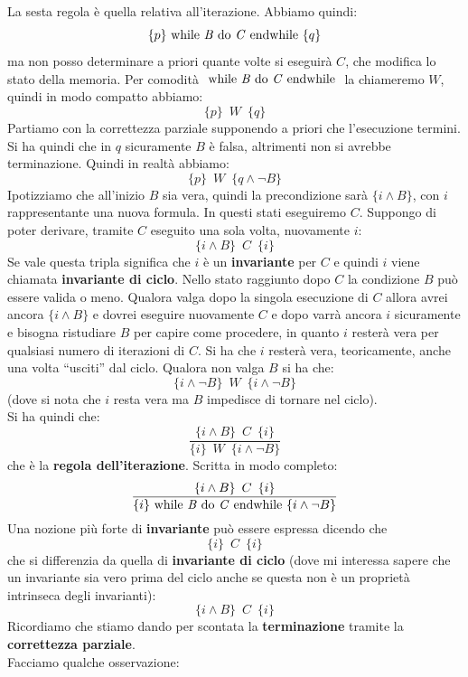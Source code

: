 \documentclass[a4paper,12pt, oneside]{book}
\begin{document}
\begin{definizione}
  La sesta regola è quella relativa all'iterazione. Abbiamo quindi:
  \[\{p\}\mbox{ while \textit{B} do \textit{C} endwhile }\{q\}\]
  ma non posso determinare a priori quante volte si eseguirà $C$, che modifica
  lo stato della memoria. Per comodità $\mbox{ while \textit{B} do \textit{C}
    endwhile }$ la chiameremo $W$, quindi in modo compatto abbiamo:
  \[\{p\}\,\,\,W\,\,\,\{q\}\]
  Partiamo con la correttezza parziale supponendo a priori che l'esecuzione
  termini. Si ha quindi che in $q$ sicuramente $B$ è falsa, altrimenti non si
  avrebbe terminazione. Quindi in realtà abbiamo:
  \[\{p\}\,\,\,W\,\,\,\{q\land \neg B\}\]
  Ipotizziamo che all'inizio $B$ sia vera, quindi la precondizione sarà
  $\{i\land B\}$, con $i$ rappresentante una nuova formula. In questi stati
  eseguiremo $C$. Suppongo di poter derivare, tramite $C$ eseguito una sola
  volta, nuovamente $i$:
  \[\{i\land B\}\,\,\,C\,\,\,\{i\}\]
  Se vale questa tripla significa che $i$ è un \textbf{invariante} per $C$ e
  quindi $i$ viene chiamata \textbf{invariante di ciclo}. Nello stato raggiunto
  dopo $C$ la condizione $B$ può essere valida o meno. Qualora valga dopo la
  singola esecuzione di $C$ allora avrei ancora $\{i\land B\}$ e dovrei eseguire
  nuovamente $C$ e dopo varrà ancora $i$ sicuramente e bisogna ristudiare $B$
  per capire come procedere, in quanto $i$ resterà vera per qualsiasi numero di
  iterazioni di $C$. Si ha che $i$ resterà vera, teoricamente, anche una volta
  ``usciti'' dal ciclo. Qualora non valga $B$ si ha che:
  \[\{i\land \neg B\}\,\,\,W\,\,\,\{i\land \neg B\}\]
  (dove si nota che $i$ resta vera ma $B$ impedisce di tornare nel ciclo).\\
  Si ha quindi che:
  \[\frac{\{i\land B\}\,\,\,C\,\,\,\{i\}}{\{i\}\,\,\,W\,\,\,\{i\land \neg B\}}\]
  che è la \textbf{regola dell'iterazione}. Scritta in modo completo:
  \[\frac{\{i\land B\}\,\,\,C\,\,\,\{i\}}{\{i\}\mbox{ while \textit{B} do
        \textit{C} endwhile }\{i\land \neg B\}}\]
  Una nozione più forte di \textbf{invariante} può essere espressa dicendo che
  \[\{i\}\,\,\,C\,\,\,\{i\}\]
  che si differenzia da quella di \textbf{invariante di ciclo} (dove mi
  interessa sapere che un invariante sia vero prima del ciclo anche se questa
  non è un proprietà intrinseca degli invarianti):
  \[\{i\land B\}\,\,\,C\,\,\,\{i\}\]
  Ricordiamo che stiamo dando per scontata la \textbf{terminazione} tramite la
  \textbf{correttezza parziale}.\\
  Facciamo qualche osservazione:
  \begin{itemize}

\end{itemize}
\end{definizione}
\end{document}
